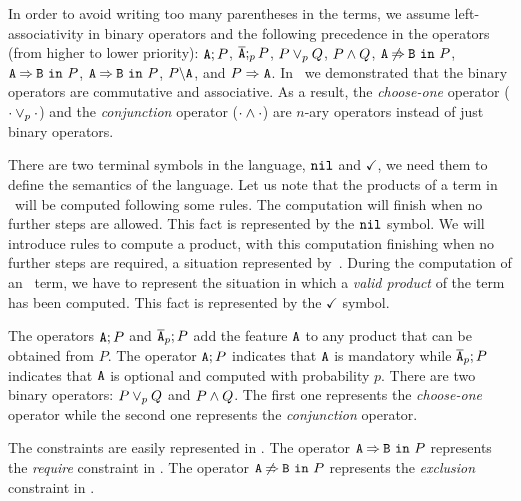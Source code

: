 In order to avoid writing too many parentheses in the terms, we
assume left-associativity in binary operators and  the
following precedence in the operators (from higher to lower priority):
$\feature{A};P$, $\ofeature{A};_{p} P$, $ P \choice_{p} Q$, $P\paral Q$,
$\exclude{A}{B}{P}$, $\require{A}{B}{P}$,
$\require{A}{B}{P}$,  $\forbid{A}{P}$, and $\mandatory{A}{P}$.
In~\cite{acl13,clc16} we demonstrated that
the binary
operators are commutative and associative.
As a result, the
\emph{choose-one} operator ($\cdot\choice_{p}\cdot$) and the
\emph{conjunction} operator ($\cdot\paral\cdot$) are $n$-ary operators
instead of just binary operators.



There are two terminal symbols in
the language, $\nil$ and $\checkmark$,
we need them to define the semantics of the language.
Let us note that the products of a term in \fodaPA\ will be computed following some rules.
The computation will finish when no further steps are allowed.
This fact is represented by the $\nil$ symbol.
We will introduce rules to compute a product, with this computation
finishing when no further steps are required, a situation represented by~\nil.
During the computation of an \fodaPAp\ term,  we have
to represent the situation in which a \emph{valid product}
of the term has been computed.
This fact is represented by the $\checkmark$ symbol.

The operators $\feature{A};P$ and $\ofeature{A}_{p};P$ add the feature $\feature{A}$ to any product that can be obtained
from $P$. The operator $\feature{A};P$ indicates that $\feature{A}$ is mandatory while $\ofeature{A}_{p};P$ indicates
that $\feature{A}$ is optional and computed with probability $p$.
There are two binary operators: $P \choice_{p} Q$ and $P\paral Q$. The
first one represents the \emph{choose-one} operator while the second one represents the  \emph{conjunction} operator.

The constraints are easily represented in \fodaPAp.
The operator $\require{A}{B}{P}$ represents the \emph{require}
constraint in \FODA.
The operator $\exclude{A}{B}{P}$ represents the \emph{exclusion}
constraint in \FODA.

